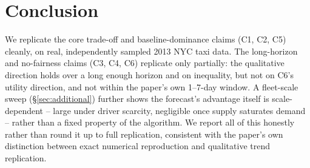 \documentclass[10pt,twocolumn,a4paper]{article}
\begin{document}
\section{Conclusion}
We replicate the core trade-off and baseline-dominance claims (C1, C2, C5)
cleanly, on real, independently sampled 2013 NYC taxi data. The long-horizon
and no-fairness claims (C3, C4, C6) replicate only partially: the
qualitative direction holds over a long enough horizon and on inequality,
but not on C6's utility direction, and not within the paper's own
1--7-day window. A fleet-scale sweep (\S\ref{sec:additional}) further shows
the forecast's advantage itself is scale-dependent -- large under driver
scarcity, negligible once supply saturates demand -- rather than a fixed
property of the algorithm. We report all of this honestly rather than round
it up to full replication, consistent with the paper's own distinction
between exact numerical reproduction and qualitative trend replication.



\end{document}
